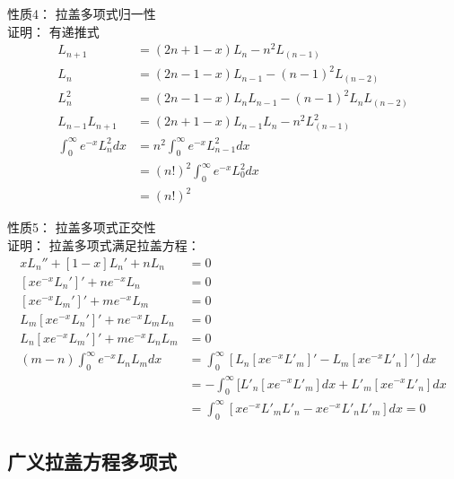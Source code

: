 \begin{frame}
	\alert{	性质4：}  拉盖多项式归一性 \\
	\alert{	证明：}  有递推式
	\begin{equation*}
		\begin{split}
			L_{n+1} &= (2n+1-x) L_n  -n^2 L_(n-1)  \\
			L_{n} &= (2n-1-x) L_{n-1}  -(n-1)^2 L_(n-2)  \\
			L^2 _{n} &= (2n-1-x) L_n  L_{n-1}  -(n-1)^2 L_n L_(n-2)  \\
			L_{n-1}	L_{n+1} &= (2n+1-x)	L_{n-1}	 L_n  -n^2 	L^2 _(n-1)  \\
			\int_{0}^{\infty}  e^{-x}  L^2 _{n}  dx &=  n^2   \int_{0}^{\infty}  e^{-x}  L^2 _{n-1} dx  \\
			&=  (n!)^2   \int_{0}^{\infty}  e^{-x}  L^2 _{0} dx  \\
			&=  (n!)^2 
		\end{split}		
	\end{equation*}	
	
\end{frame}		

\begin{frame}
	\alert{	性质5：}  拉盖多项式正交性 \\
	\alert{	证明：}  拉盖多项式满足拉盖方程：
	\begin{equation*}
		\begin{split}
			x L_n''  + [1 -x] L_n' +n L_n &=0  \\
			[xe^{-x}  L_n'] ' +n e^{-x} L_n &=0  \\
			[xe^{-x}  L_m'] ' +m e^{-x} L_m &=0  \\ 
			L_m[xe^{-x}  L_n'] ' +n e^{-x} L_m L_n &=0  \\
			L_n  [xe^{-x}  L_m'] ' +m e^{-x} L_n L_m& =0  \\ 
			(m-n) \int_{0}^{\infty}  e^{-x} L_n L_m dx &=  \int_{0}^{\infty} [L_n  [xe^{-x}  L' _m] ' - L_m[xe^{-x}  L' _n] '] dx \\
			&=  -\int_{0}^{\infty} [L'_n  [xe^{-x}  L' _m] dx + L'_m[xe^{-x}  L' _n]  dx \\
			&=  \int_{0}^{\infty} [xe^{-x}  L' _m L' _n - xe^{-x}  L' _n L' _m]  dx =0
		\end{split}		
	\end{equation*}	
\end{frame}		

\subsection{广义拉盖方程多项式}

